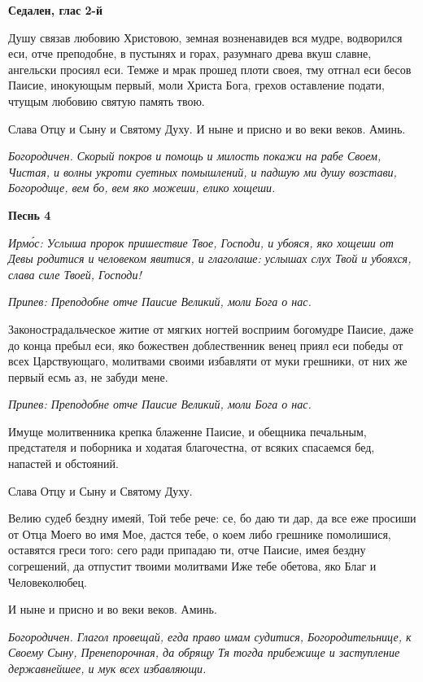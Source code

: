 \bfseries Седален, глас 2-й\normalfont{}


Душу связав любовию Христовою, земная возненавидев вся мудре, водворился еси, отче преподобне, в пустынях и горах, разумнаго древа вкуш славне, ангельски просиял еси. Темже и мрак прошед плоти своея, тму отгнал еси бесов Паисие, инокующым первый, моли Христа Бога, грехов оставление подати, чтущым любовию святую память твою.


Слава Отцу и Сыну и Святому Духу. И ныне и присно и во веки веков. Аминь.


\itshape Богородичен.\normalfont{} Скорый покров и помощь и милость покажи на рабе Своем, Чистая, и волны укроти суетных помышлений, и падшую ми душу возстави, Богородице, вем бо, вем яко можеши, елико хощеши.





\bfseries Песнь 4\normalfont{}


\itshape Ирмо́с:\normalfont{} Услыша пророк пришествие Твое, Господи, и убояся, яко хощеши от Девы родитися и человеком явитися, и глаголаше: услышах слух Твой и убояхся, слава силе Твоей, Господи!


\itshape Припев:\normalfont{} Преподобне отче Паисие Великий, моли Бога о нас.


Законострадальческое житие от мягких ногтей восприим богомудре Паисие, даже до конца пребыл еси, яко божествен доблественник венец приял еси победы от всех Царствующаго, молитвами своими избавляти от муки грешники, от них же первый есмь аз, не забуди мене.


\itshape Припев:\normalfont{} Преподобне отче Паисие Великий, моли Бога о нас.


Имуще молитвенника крепка блаженне Паисие, и обещника печальным, предстателя и поборника и ходатая благочестна, от всяких спасаемся бед, напастей и обстояний.


Слава Отцу и Сыну и Святому Духу.


Велию судеб бездну имеяй, Той тебе рече: се, бо даю ти дар, да все еже просиши от Отца Моего во имя Мое, дастся тебе, о коем либо грешнике помолишися, оставятся греси того: сего ради припадаю ти, отче Паисие, имея бездну согрешений, да отпустит твоими молитвами Иже тебе обетова, яко Благ и Человеколюбец.


И ныне и присно и во веки веков. Аминь.


\itshape Богородичен.\normalfont{} Глагол провещай, егда право имам судитися, Богородительнице, к Своему Сыну, Пренепорочная, да обрящу Тя тогда прибежище и заступление державнейшее, и мук всех избавляющи.


